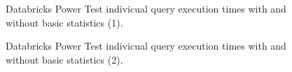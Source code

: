 \begin{figure}
   \begin{center}
   \end{center}
   \caption{Databricks Power Test indivicual query execution times with and without basic statistics (1).}
   \label{fig:additionalResultsDatabricksWithBasicStatsPowerTestIndividualQueries1}
\end{figure}

\begin{figure}
   \begin{center}
   \end{center}
   \caption{Databricks Power Test indivicual query execution times with and without basic statistics (2).}
   \label{fig:additionalResultsDatabricksWithBasicStatsPowerTestIndividualQueries2}
\end{figure}

